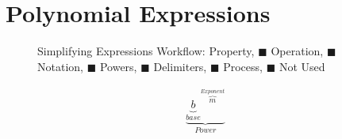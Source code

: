 \documentclass[20150903-160354-rs2.2-MarksMathNotebook.tex]{subfiles}
\begin{document}




\section{Polynomial Expressions}






\newpage
\begin{figure}

\caption{Simplifying Expressions Workflow: \newline {\color{sthlmRed!40}\ensuremath{\blacksquare}} Property, {\color{sthlmBlue!40}\ensuremath{\blacksquare}} Operation, {\color{sthlmGreen!40}\ensuremath{\blacksquare}} Notation, {\color{sthlmPurple!40}\ensuremath{\blacksquare}} Powers, {\color{sthlmYellow!40}\ensuremath{\blacksquare}} Delimiters, {\color{sthlmOrange!40}\ensuremath{\blacksquare}} Process, {\color{sthlmDarkGrey!40}\ensuremath{\blacksquare}} Not Used}
\end{figure}






\begin{definition}
\begin{align}
\underbrace{{\underbrace{b}_{base}}^{\overbrace{m}^{Exponent}}}_{Power} \label{eq:ooe}
\end{align}
\end{definition}
\end{document}
